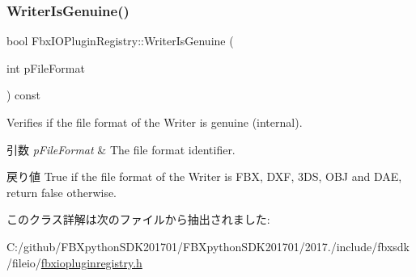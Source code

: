 \subsubsection{\texorpdfstring{Writer\+Is\+Genuine()}{WriterIsGenuine()}}
{\footnotesize\ttfamily bool Fbx\+I\+O\+Plugin\+Registry\+::\+Writer\+Is\+Genuine (\begin{DoxyParamCaption}\item[{int}]{p\+File\+Format }\end{DoxyParamCaption}) const}

Verifies if the file format of the Writer is genuine (internal). 
\begin{DoxyParams}{引数}
{\em p\+File\+Format} & The file format identifier. \\
\hline
\end{DoxyParams}
\begin{DoxyReturn}{戻り値}
{\ttfamily True} if the file format of the Writer is F\+BX, D\+XF, 3\+DS, O\+BJ and D\+AE, return {\ttfamily false} otherwise. 
\end{DoxyReturn}


このクラス詳解は次のファイルから抽出されました\+:\begin{DoxyCompactItemize}
\item 
C\+:/github/\+F\+B\+Xpython\+S\+D\+K201701/\+F\+B\+Xpython\+S\+D\+K201701/2017./include/fbxsdk/fileio/\hyperlink{fbxiopluginregistry_8h}{fbxiopluginregistry.\+h}\end{DoxyCompactItemize}
